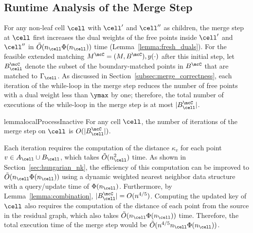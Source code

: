     

%

%

%
%
%
%
%

%






%

%
%

%

%

%
%
%
%

%

%
%
%
%
%
%




%
%
%
%
%
%
%
%
    
%

\subsection{Runtime Analysis of the Merge Step} 
For any non-leaf cell $\cell$ with $\cell'$ and $\cell''$ as children, the merge step at $\cell$ first increases the dual weights of the free points inside $\cell'$ and $\cell''$ in $\tilde{O}(n_\cell\Phi(n_\cell))$ time (Lemma~\ref{lemma:fresh_duals}). For the feasible extended matching $M^\mcC=(M, B^\mcC), y(\cdot)$ after this initial step, let $B^\mcC_\cell$ denote the subset of the boundary-matched points in $B^\mcC$ that are matched to $\Gamma_\cell$. As discussed in Section~\ref{subsec:merge_correctness}, each iteration of the while-loop in the merge step reduces the number of free points with a dual weight less than $\ymax$ by one; therefore, the total number of executions of the while-loop in the merge step is at most $|B^\mcC_\cell|$.

\begin{restatable}{lemma}{localProcessInactive}\label{lemma:local-inactive}
    For any cell $\cell$, the number of iterations of the merge step on $\cell$ is $O(|B^\mcC_\cell|)$.
\end{restatable}

Each iteration requires the computation of the distance $\kappa_v$ for each point $v\in A_\cell\cup B_\cell$, which takes $\tilde{O}(n_\cell^2)$ time. As shown in Section~\ref{sec:hungarian_nk}, the efficiency of this computation can be improved to $\tilde{O}(n_\cell\Phi(n_\cell))$ using a dynamic weighted nearest neighbor data structure with a query/update time of $\Phi(n_\cell)$. Furthermore, by Lemma~\ref{lemma:combination}, $|B_{\cell}^\mcC|=O(n^{4/5})$. Computing the updated key of $\cell$ also requires the computation of the distance of each point from the source in the residual graph, which also takes $\tilde{O}(n_\cell\Phi(n_\cell))$ time. Therefore, the total execution time of the merge step would be $\tilde{O}(n^{4/5}n_\cell\Phi(n_\cell))$.



